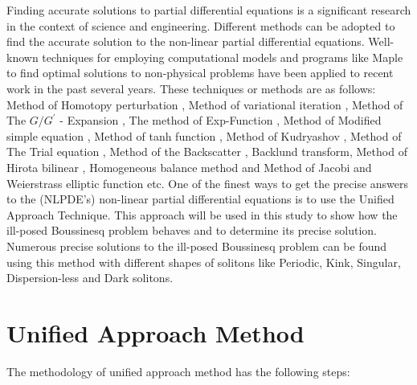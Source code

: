 \documentclass{article}
\numberwithin{equation}{section}
\begin{document}
Finding accurate solutions to partial differential equations is a significant research in the context of science and engineering. Different methods can be adopted to find the accurate solution to the non-linear partial differential equations. Well-known techniques for employing computational models and programs like Maple to find optimal solutions to non-physical problems have been applied to recent work in the past several years. These techniques or methods are as follows: Method of Homotopy perturbation \cite{A1}, Method of variational iteration \cite{A2}, Method of The $G/G^{'}$ - Expansion \cite{A3,a4,a5}, The method of Exp-Function \cite{a6,a7,a8,a9}, Method of Modified simple equation \cite{a10,a11}, Method of tanh function \cite{a12,a13,a14}, Method of Kudryashov \cite{a15,a16}, Method of The Trial equation \cite{a17}, Method of the Backscatter \cite{a18}, Backlund transform\cite{a19}, Method of Hirota bilinear \cite{a20}, Homogeneous balance method\cite{a21} and Method of Jacobi and Weierstrass elliptic function \cite{a22} etc. One of the finest ways to get the precise answers to the (NLPDE's) non-linear partial differential equations is to use the Unified Approach Technique. This approach will be used in this study to show how the ill-posed Boussinesq problem behaves and to determine its precise solution. Numerous precise solutions to the ill-posed Boussinesq problem can be found using this method with different shapes of solitons like Periodic, Kink, Singular, Dispersion-less and Dark solitons.
\section{Unified Approach Method }
The methodology of unified approach method has the following steps:
\end{document}
